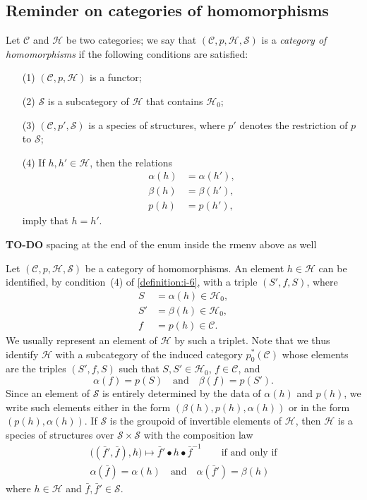 \documentclass[a4paper,fleqn]{article}
\theoremstyle{plain}
\theoremstyle{definition}
\newenvironment{definition}[1]
  {\renewcommand\theinnerdefinition{#1}\innerdefinition}
  {\endinnerdefinition}
\newcommand{\oldpage}[1]{{\marginpar{\footnotesize$\bigg\vert$\,\,\,\,\textit{p.~#1}}}}
\newcommand{\todo}{{\color{purple}\textbf{TO-DO }}}
\newcommand{\textand}{\quad\text{and}\quad}
\newcommand{\CC}{\mathcal{C}}
\newcommand{\HH}{\mathcal{H}}
\renewcommand{\SS}{\mathcal{S}}
\begin{document}
\subsection{Reminder on categories of homomorphisms}
\label{section:i.4}

\begin{definition}{6}
\label{definition:i-6}
  Let $\CC$ and $\HH$ be two categories;
  we say \cite{3a} that $(\CC,p,\HH,\SS)$ is a \emph{category of homomorphisms} if the following conditions are satisfied:
  \begin{enumerate}
    \item[\normalfont(1)]
      $(\CC,p,\HH)$ is a functor;
    \item[\normalfont(2)]
      \oldpage{357}
      $\SS$ is a subcategory of $\HH$ that contains $\HH_0$;
    \item[\normalfont(3)]
      $(\CC,p',\SS)$ is a species of structures, where $p'$ denotes the restriction of $p$ to $\SS$;
    \item[\normalfont(4)]
      If $h,h'\in\HH$, then the relations
      \[
        \begin{aligned}
          \alpha(h)
          &= \alpha(h'),
        \\\beta(h)
          &= \beta(h'),
        \\p(h)
          &= p(h'),
        \end{aligned}
      \]
      imply that $h=h'$.
  \end{enumerate}
\end{definition}

\todo{spacing at the end of the enum inside the rmenv above as well}

Let $(\CC,p,\HH,\SS)$ be a category of homomorphisms.
An element $h\in\HH$ can be identified, by condition~(4) of \cref{definition:i-6}, with a triple $(S',f,S)$, where
\[
  \begin{aligned}
    S
    &= \alpha(h) \in\HH_0,
  \\S'
    &= \beta(h) \in\HH_0,
  \\f
    &= p(h)\in\CC.
  \end{aligned}
\]
We usually represent an element of $\HH$ by such a triplet.
Note that we thus identify $\HH$ with a subcategory of the induced category $p_0^*(\CC)$ whose elements are the triples $(S',f,S)$ such that $S,S'\in\HH_0$, $f\in\CC$, and
\[
  \alpha(f)=p(S)
  \textand
  \beta(f)=p(S').
\]
Since an element of $\SS$ is entirely determined by the data of $\alpha(h)$ and $p(h)$, we write such elements either in the form $(\beta(h),p(h),\alpha(h))$ or in the form $(p(h),\alpha(h))$.
If $\SS$ is the groupoid of invertible elements of $\HH$, then $\HH$ is a species of structures over $\SS\times\SS$ with the composition law
\[
  \begin{gathered}
    \big((\bar{f}',\bar{f}),h\big)
    \longmapsto\bar{f}'\bullet h\bullet\bar{f}^{-1}
    \qquad\text{if and only if}
  \\\alpha(\bar{f})=\alpha(h)
    \textand
    \alpha(\bar{f}')=\beta(h)
  \end{gathered}
\]
where $h\in\HH$ and $\bar{f},\bar{f}'\in\SS$.
\end{document}
